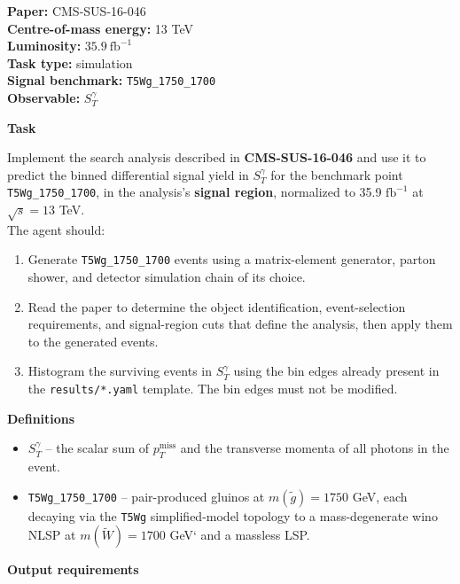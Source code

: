 \documentclass{article}
\begin{document}
\begin{agentcard}
\small
\textbf{Paper:} CMS-SUS-16-046 \\
\textbf{Centre-of-mass energy:} 13 TeV \\
\textbf{Luminosity:} \(35.9~\mathrm{fb}^{-1}\) \\
\textbf{Task type:} simulation \\
\textbf{Signal benchmark:} \texttt{T5Wg\_1750\_1700} \\
\textbf{Observable:} \(S_T^\gamma\)
\medskip

\textbf{Task}


Implement the search analysis described in \textbf{CMS-SUS-16-046} and use it to predict the binned differential signal yield in $S_T^\gamma$ for the benchmark point \texttt{T5Wg\_1750\_1700}, in the analysis's {\bf signal region}, normalized to 35.9 $\mathrm{fb}^{-1}$ at $\sqrt s = 13$ TeV.\\

The agent should:
\begin{enumerate}
    \item Generate \texttt{T5Wg\_1750\_1700} events using a matrix-element generator, parton shower, and detector simulation chain of its choice.
    \item Read the paper to determine the object identification, event-selection requirements, and signal-region cuts that define the analysis, then apply them to the generated events.
    \item Histogram the surviving events in \(S_T^\gamma\) using the bin edges already present in the \texttt{results/*.yaml} template. The bin edges must not be modified.
\end{enumerate}

\textbf{Definitions}

\begin{itemize}
    \item \(S_T^\gamma\) -- the scalar sum of \(p_T^{\mathrm{miss}}\) and the transverse momenta of all photons in the event.
    \item \texttt{T5Wg\_1750\_1700} -- pair-produced gluinos at $m(\tilde g) = 1750$ GeV, each decaying via the {\tt T5Wg} simplified-model topology to a mass-degenerate wino NLSP at $m(\widetilde W) = 1700$ GeV` and a massless LSP.

\end{itemize}

\textbf{Output requirements}


\end{agentcard}
\end{document}
